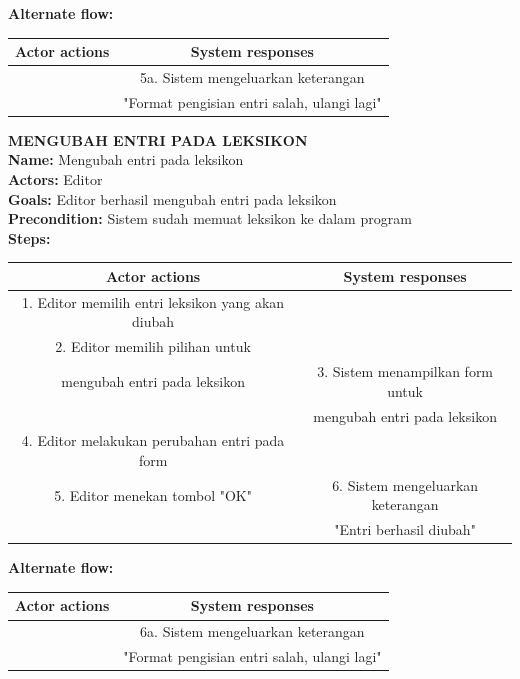 \textbf{Alternate flow:}

\begin{table}[H]
\centering
\begin{tabular}{|c|c|}
\hline
\textbf{Actor actions} & \textbf{System responses} \\
\hline
&5a. Sistem mengeluarkan keterangan \\&"Format pengisian entri salah, ulangi lagi"\\
\hline
\end{tabular}
\end{table}

\textbf{MENGUBAH ENTRI PADA LEKSIKON}\\
\textbf{Name:} Mengubah entri pada leksikon\\
\textbf{Actors:} Editor\\
\textbf{Goals:} Editor berhasil mengubah entri pada leksikon\\
\textbf{Precondition:} Sistem sudah memuat leksikon ke dalam program\\
\textbf{Steps:}

\begin{table}[H]
\centering
\begin{tabular}{|c|c|}
\hline
\textbf{Actor actions} & \textbf{System responses} \\
\hline
1. Editor memilih entri leksikon yang akan diubah&\\
2. Editor memilih pilihan untuk&\\ mengubah entri pada leksikon&
3. Sistem menampilkan form untuk \\&mengubah entri pada leksikon\\
4. Editor melakukan perubahan entri pada form&\\
5. Editor menekan tombol "OK"&
6. Sistem mengeluarkan keterangan \\&"Entri berhasil diubah"\\
\hline
\end{tabular}
\end{table}

\textbf{Alternate flow:}

\begin{table}[H]
\centering
\begin{tabular}{|c|c|}
\hline
\textbf{Actor actions} & \textbf{System responses} \\
\hline
&6a. Sistem mengeluarkan keterangan \\&"Format pengisian entri salah, ulangi lagi"\\
\hline
\end{tabular}
\end{table}

